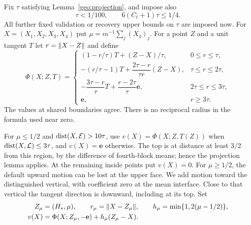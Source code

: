 Fix $\tau$ satisfying Lemma~\ref{geo:projection}, and impose also
\begin{equation}\label{geo:tau-choice}
 \tau<1/100,\qquad6(C_t+1)\tau\le1/4.
\end{equation}
All further fixed validation or recovery upper bounds on $\tau$ are
imposed now. For $X=(X_1,X_2,X_3,X_4)$ put
$\mu=m^{-1}\sum_j(X_4)_j$. For a point $Z$ and a unit tangent $T$ let
$r=\lVert X-Z\rVert$ and define
\begin{equation}\label{geo:Phi}
 \Phi(X;Z,T)=
 \begin{cases}
 (1-r/\tau)T+(Z-X)/\tau,&0\le r\le\tau,\\[2pt]
 -(r/\tau-1)T+\dfrac{2\tau-r}{\tau r}(Z-X),
                       &\tau\le r\le2\tau,\\[5pt]
 -\dfrac{3\tau-r}{\tau}T+\dfrac{r-2\tau}{\tau}\mathbf e,
                       &2\tau\le r\le3\tau,\\[5pt]
 \mathbf e,&r\ge3\tau.
 \end{cases}
\end{equation}
The values at shared boundaries agree. There is no reciprocal radius
in the formula used near zero.

For $\mu\le1/2$ and $\operatorname{dist}(X,\mathcal E)>10\tau$, use
$v(X)=\Phi(X;Z,T(Z))$ when $\operatorname{dist}(X,\mathcal L)\le3\tau$, and
$v(X)=\mathbf e$ otherwise. The top is at distance at least $3/2$
from this region, by the difference of fourth-block means; hence the
projection lemma applies. At the remaining inside points put $v(X)=0$.
For $\mu\ge1/2$, the default upward motion can be lost at the upper
face. We add motion toward the distinguished vertical, with coefficient
zero at the mean interface. Close to that vertical the tangent direction
is downward, including at its top. Set
\begin{equation}\label{geo:outside}
 \begin{aligned}
 Z_\mu&=(H_*,\mu),\qquad r_\mu=\lVert X-Z_\mu\rVert,\qquad
 h_\mu=\min\{1,2(\mu-1/2)\},\\
 v(X)&=\Phi(X;Z_\mu,-\mathbf e)+h_\mu(Z_\mu-X).
 \end{aligned}
\end{equation}

